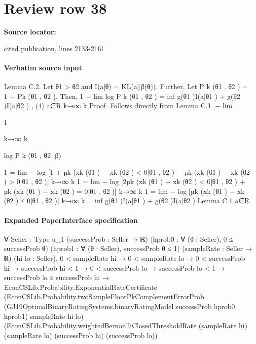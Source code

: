 \documentclass[10pt]{article}
\begin{document}
\section*{Review row 38}
\textbf{Source locator:} {\footnotesize\raggedright cited publication, lines 2133-\allowbreak{}2161\par}
\paragraph{Verbatim source input}
\begin{ReviewVerbatim}
Lemma C.2. Let θ1 > θ2 and I(a|θ) = KL(a||β(θ)). Further, Let P k (θ1 , θ2 ) = 1 − Pk (θ1 , θ2 ).
Then,
1
− lim log P k (θ1 , θ2 ) = inf {g(θ1 )I(a|θ1 ) + g(θ2 )I(a|θ2 )} ,
(4)
a∈R
k→∞ k
Proof. Follows directly from Lemma C.1.
− lim

1

k→∞ k

log P k (θ1 , θ2 |β)

1
= lim − log [1 + µk (xk (θ1 ) − xk (θ2 ) < 0|θ1 , θ2 ) − µk (xk (θ1 ) − xk (θ2 ) > 0|θ1 , θ2 )]
k→∞ k
1
= lim − log [2µk (xk (θ1 ) − xk (θ2 ) < 0|θ1 , θ2 ) + µk (xk (θ1 ) − xk (θ2 ) = 0|θ1 , θ2 )]
k→∞ k
1
= lim − log [µk (xk (θ1 ) − xk (θ2 ) ≤ 0|θ1 , θ2 )]
k→∞ k
= inf {g(θ1 )I(a|θ1 ) + g(θ2 )I(a|θ2 )}
Lemma C.1
a∈R
\end{ReviewVerbatim}


\paragraph{Expanded PaperInterface specification}
\begin{ReviewVerbatim}
∀ {Seller : Type u_1} (successProb : Seller → ℝ) (hprob0 : ∀ (θ : Seller), 0 ≤ successProb θ)
  (hprob1 : ∀ (θ : Seller), successProb θ ≤ 1) (sampleRate : Seller → ℝ) (hi lo : Seller),
  0 < sampleRate hi →
    0 < sampleRate lo →
      0 < successProb hi →
        successProb hi < 1 →
          0 < successProb lo →
            successProb lo < 1 →
              successProb lo ≤ successProb hi →
                EconCSLib.Probability.ExponentialRateCertificate
                  (EconCSLib.Probability.twoSampleFloorPkComplementErrorProb
                    (GJ19OptimalBinaryRatingSystems.binaryRatingModel successProb hprob0 hprob1) sampleRate hi lo)
                  (EconCSLib.Probability.weightedBernoulliClosedThresholdRate (sampleRate hi) (sampleRate lo)
                    (successProb hi) (successProb lo))
\end{ReviewVerbatim}
\end{document}
